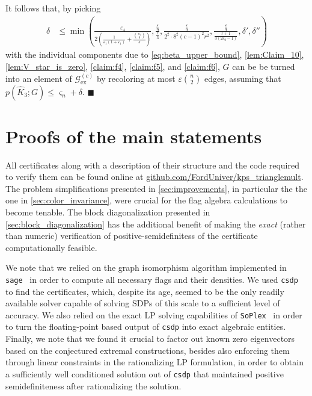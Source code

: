 \documentclass[a4paper,11pt]{article}
\numberwithin{equation}{section}
\newcommand{\mG}{\mathcal{G}}
\begin{document}
%
It follows that, by picking 
%
\begin{align*}
    \delta &\le \min \left( \frac{\varepsilon_4}
    {2\left(\frac{1}{\varepsilon_1(1+\varepsilon_1)}+\frac{\binom{n_1}{6}}{s}\right)},
        \frac{\frac{\varepsilon}{9}}{\frac{r}{3}},\frac{\frac{\varepsilon}{9}}{2^2\cdot 8^2(c-1)^2r^2},\frac{\frac{\varepsilon}{9}}{\frac{r+1}{3(2\delta_0-1)}}, \delta', \delta''\right)
\end{align*}
%
with the individual components due to \cref{eq:beta_upper_bound}, \cref{lem:Claim_10}, \cref{lem:V_star_is_zero}, \cref{claim:f4}, \cref{claim:f5}, and \cref{claim:f6}, $G$ can be be turned into an element of $\mG_{\operatorname{ex}}^{(c)}$ by recoloring at most $\varepsilon\binom{n}{2}$ edges, assuming that $p(\hat{K}_3; G) \leq \varsigma_n + \delta$. \hfill $\blacksquare$

\section{Proofs of the main statements} \label{sec:proof}

All certificates along with a description of their structure and the code required to verify them can be found online at \url{github.com/FordUniver/kps_trianglemult}. The problem simplifications presented in \cref{sec:improvements}, in particular the the one in \cref{sec:color_invariance}, were crucial for the flag algebra calculations to become tenable. The block diagonalization presented in \cref{sec:block_diagonalization} has the additional benefit of making the \emph{exact} (rather than numeric) verification of positive-semidefinitess of the certificate computationally feasible.

We note that we relied on the graph isomorphism algorithm implemented in {\tt sage}~\cite{sagemath} in order to compute all necessary flags and their densities. We used {\tt csdp}~\cite{Borchers_1999}  to find the certificates, which, despite its age, seemed to be the only readily available solver capable of solving SDPs of this scale to a sufficient level of accuracy. We also relied on the exact LP solving capabilities of {\tt SoPlex}~\cite{GleixnerSteffyWolter2015, eifler2023computational, gleixner2012improving, gleixner2020linear} in order to turn the floating-point based output of {\tt csdp} into exact algebraic entities. Finally, we note that we found it crucial to factor out known zero eigenvectors based on the conjectured extremal constructions, besides also enforcing them through linear constraints in the rationalizing LP formulation, in order to obtain a sufficiently well conditioned solution out of {\tt csdp} that maintained positive semidefiniteness after rationalizing the solution.
\end{document}
